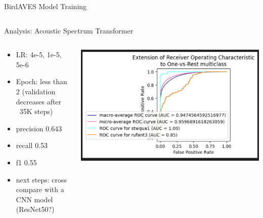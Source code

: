 \begin{frame}{BirdAVES Model Training}
\begin{columns}
\begin{column}{0.5\textwidth}
    \end{column}   
    \end{columns}
\end{frame}

\begin{frame}{Analysis: Acoustic Spectrum Transformer}
    \begin{columns}
        \begin{column}{0.5\textwidth}
        \begin{itemize}
        \item LR: 4e-5, 1e-5, 5e-6
        \item Epoch: less than 2 (validation decreases after ~35K steps)
        \item precision 0.643
        \item recall 0.53
        \item f1 0.55
        \item next steps: cross compare with a CNN model (ResNet50?)
        \end{itemize}
    \end{column}
    \begin{column}{0.5\textwidth}
        \centering
        \includegraphics[height=0.85\textheight,width=1\textwidth,keepaspectratio]{images/ast_auc.png} 
    \end{column}   
    \end{columns}
\end{frame}